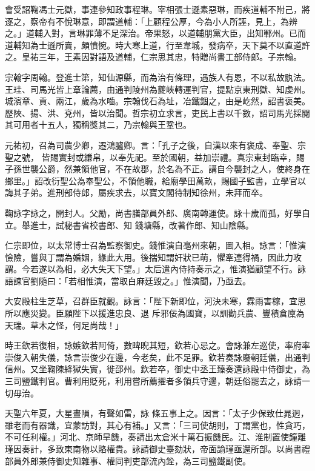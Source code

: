 \begin{pinyinscope}
 會受詔鞠馮士元獄，事連參知政事程琳。宰相張士遜素惡琳，而疾道輔不附己，將逐之，察帝有不悅琳意，即謂道輔：「上顧程公厚，今為小人所誣，見上，為辨之。」道輔入對，言琳罪薄不足深治。帝果怒，以道輔朋黨大臣，出知鄆州。已而道輔知為士遜所賣，頗憤惋。時大寒上道，行至韋城，發病卒，天下莫不以直道許之。皇祐三年，王素因對語及道輔，仁宗思其忠，特贈尚書工部侍郎。子宗翰。



 宗翰字周翰。登進士第，知仙源縣，而為治有條理，遇族人有恩，不以私故骫法。王珪、司馬光皆上章論薦，由通判陵州為夔峽轉運判官，提點京東刑獄、知虔州。城濱章、貢、兩江，歲為水嚙。宗翰伐石為址，冶鐵錮之，由是屹然，詔書褒美。歷陜、揚、洪、兗州，皆以治聞。哲宗初立求言，吏民上書以千數，詔司馬光採閱其可用者十五人，獨稱獎其二，乃宗翰與王鞏也。



 元祐初，召為司農少卿，遷鴻臚卿。言：「孔子之後，自漢以來有褒成、奉聖、宗聖之號，
 皆賜實封或縑帛，以奉先祀。至於國朝，益加崇禮。真宗東封臨幸，賜子孫世襲公爵，然兼領他官，不在故郡，於名為不正。講自今襲封之人，使終身在鄉里。」詔改衍聖公為奉聖公，不領他職，給廟學田萬畝，賜國子監書，立學官以誨其子弟。進刑部侍郎，屬疾求去，以寶文閣待制知徐州，未拜而卒。



 鞠詠字詠之，開封人。父勵，尚書膳部員外郎、廣南轉運使。詠十歲而孤，好學自立。舉進士，試秘書省校書郎、知
 錢塘縣，改著作郎、知山陰縣。



 仁宗即位，以太常博士召為監察御史。錢惟演自亳州來朝，圖入相。詠言：「惟演憸險，嘗與丁謂為婚姻，緣此大用。後揣知謂奸狀已萌，懼牽連得禍，因此力攻謂。今若遂以為相，必大失天下望。」太后遣內侍持奏示之，惟演猶顧望不行。詠語諫官劉隨曰：「若相惟演，當取白麻廷毀之。」惟演聞，乃亟去。



 大安殿柱生芝草，召群臣就觀。詠言：「陛下新即位，河決未寒，霖雨害稼，宜思所以應災變。臣願陛下以援進忠良、退
 斥邪佞為國寶，以訓勸兵農、豐積倉廩為天瑞。草木之怪，何足尚哉！」



 時王欽若復相，詠嫉欽若阿倚，數睥睨其短，欽若心忌之。會詠兼左巡使，率府率崇俊入朝失儀，詠言崇俊少在邊，今老矣，此不足罪。欽若奏詠廢朝廷儀，出通判信州。又坐鞠陳絳獄失實，徙邵州。欽若卒，御史中丞王臻奏還詠殿中侍御史，為三司鹽鐵判官。曹利用貶死，利用嘗所薦擢者多領兵守邊，朝廷俗罷去之，詠請一切毋治。



 天聖六年夏，大星晝隕，有聲如雷，詠
 條五事上之。因言：「太子少保致仕晁迥，雖老而有器識，宜蒙訪對，其心有補。」又言：「三司使胡則，丁謂黨也，性貪巧，不可任利權。」河北、京師旱饑，奏請出太倉米十萬石振饑民。江、淮制置使鐘離瑾因奏計，多致東南物以賂權貴。詠請御史臺劾狀，帝面諭瑾亟還所部。以尚書禮部員外郎兼侍御史知雜事、權同判吏部流內銓，為三司鹽鐵副使。




\end{pinyinscope}
